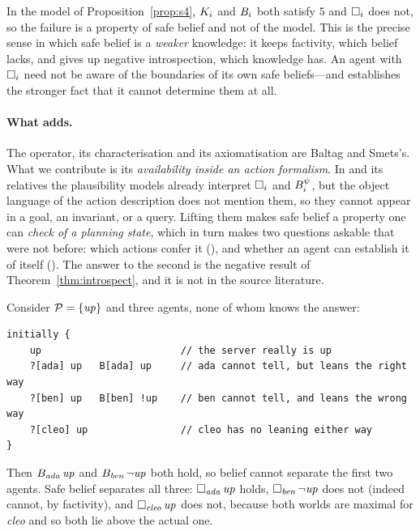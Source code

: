 \documentclass[11pt,a4paper]{article}
\begin{document}
\begin{remark}
\label{rem:axioms}
In the model of Proposition~\ref{prop:s4}, $K_{i}$ and $B_{i}$ both satisfy $5$ and
$\Box_{i}$ does not, so the failure is a property of safe belief and not of the model. This is
the precise sense in which safe belief is a \emph{weaker} knowledge: it keeps factivity,
which belief lacks, and gives up negative introspection, which knowledge has. An agent with
$\Box_{i}$ need not be aware of the boundaries of its own safe beliefs---and
 establishes the stronger fact that it cannot determine them at all.
\end{remark}

\paragraph{What \mBplus{} adds.}
The operator, its characterisation and its axiomatisation are Baltag and Smets's. What we
contribute is its \emph{availability inside an action formalism}. In \mB{} and its relatives
the plausibility models already interpret $\Box_{i}$ and $B^{\psi}_{i}$, but the object
language of the action description does not mention them, so they cannot appear in a goal, an
invariant, or a query. Lifting them makes safe belief a property one can \emph{check of a
planning state}, which in turn makes two questions askable that were not before: which actions
confer it (), and whether an agent can establish it of itself
(). The answer to the second is the negative result of
Theorem~\ref{thm:introspect}, and it is not in the source literature.

\begin{example}
\label{ex:safe}
Consider $\mathcal{P} = \{\mathit{up}\}$ and three agents, none of whom knows the answer:
\begin{lstlisting}
initially {
    up                        // the server really is up
    ?[ada] up   B[ada] up     // ada cannot tell, but leans the right way
    ?[ben] up   B[ben] !up    // ben cannot tell, and leans the wrong way
    ?[cleo] up                // cleo has no leaning either way
}
\end{lstlisting}
Then $B_{\mathit{ada}}\,\mathit{up}$ and $B_{\mathit{ben}}\,\neg\mathit{up}$ both hold, so
belief cannot separate the first two agents. Safe belief separates all three:
$\Box_{\mathit{ada}}\,\mathit{up}$ holds, $\Box_{\mathit{ben}}\,\neg\mathit{up}$ does not
(indeed cannot, by factivity), and $\Box_{\mathit{cleo}}\,\mathit{up}$ does not, because both
worlds are maximal for \emph{cleo} and so both lie above the actual one.
\end{example}
\end{document}
